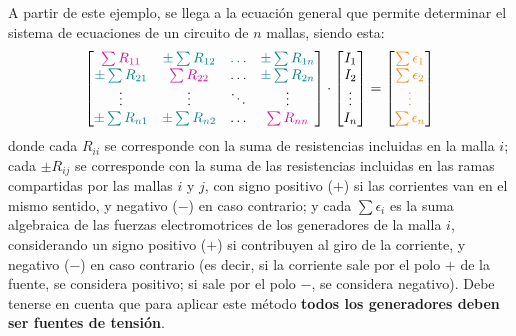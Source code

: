 \documentclass[11pt]{book} %
\begin{document}
	A partir de este ejemplo, se llega a la ecuación general que permite determinar el sistema de ecuaciones de un circuito de $n$ mallas, siendo esta: 
	\begin{equation*}
		\begin{bmatrix}
			{\color{magenta}\sum R_{11}} &  {\color{teal}\pm\sum R_{12}} & {\color{teal}{\dots}} & {\color{teal}\pm\sum R_{1n}} \\
			{\color{teal}\pm\sum R_{21}} & {\color{magenta}\sum R_{22}} & {{\dots}} & {\color{teal}\pm\sum R_{2n}} \\
			{\vdots} & {\vdots} &  {\ddots} & \vdots\\
			{\color{teal}\pm\sum R_{n1}} & {\color{teal}\pm\sum R_{n2}} & \dots & {\color{magenta}\sum R_{nn}}
		\end{bmatrix} \cdot 
		\begin{bmatrix}
			I_1\\
			I_2\\
			\vdots\\
			I_n
		\end{bmatrix} = %
		\begin{bmatrix}
			{\color{orange}\sum\epsilon_1}\\
			{\color{orange}\sum\epsilon_2}\\
			{\color{orange}\vdots}\\
			{\color{orange}\sum\epsilon_n}
		\end{bmatrix}
	\end{equation*}
	donde cada {\color{magenta}$R_{ii}$} se corresponde con la suma de resistencias incluidas en la malla $i$; cada {\color{teal}$\pm R_{ij}$} se corresponde con la suma de las resistencias incluidas en las ramas compartidas por las mallas $i$ y $j$, con signo positivo ($+$) si las corrientes van en el mismo sentido, y negativo ($-$) en caso contrario; y cada {\color{orange} $\sum \epsilon_i$} es la suma algebraica de las fuerzas electromotrices de los generadores de la malla $i$, considerando un signo positivo ($+$) si contribuyen al giro de la corriente, y negativo ($-$) en caso contrario (es decir, si la corriente sale por el polo $+$ de la fuente, se considera positivo; si sale por el polo $-$, se considera negativo). Debe tenerse en cuenta que para aplicar este método \textbf{todos los generadores deben ser fuentes de tensión}. 
	
\end{document}
